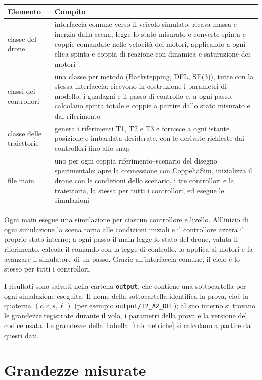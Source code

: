 \documentclass[11pt,a4paper]{article}
\begin{document}
\begin{center}
\begin{tabularx}{\textwidth}{@{}l L@{}}
\toprule
Elemento & Compito \\
\midrule
classe del drone & interfaccia comune verso il veicolo simulato: ricava massa e inerzia dalla scena, legge lo stato misurato e converte spinta e coppie comandate nelle velocità dei motori, applicando a ogni elica spinta e coppia di reazione con dinamica e saturazione dei motori \\ \addlinespace
classi dei controllori & una classe per metodo (Backstepping, DFL, SE(3)), tutte con la stessa interfaccia: ricevono in costruzione i parametri di modello, i guadagni e il passo di controllo e, a ogni passo, calcolano spinta totale e coppie a partire dallo stato misurato e dal riferimento \\ \addlinespace
classe delle traiettorie & genera i riferimenti T1, T2 e T3 e fornisce a ogni istante posizione e imbardata desiderate, con le derivate richieste dai controllori fino allo snap \\ \addlinespace
file main & uno per ogni coppia riferimento--scenario del disegno sperimentale: apre la connessione con CoppeliaSim, inizializza il drone con le condizioni dello scenario, i tre controllori e la traiettoria, la stessa per tutti i controllori, ed esegue le simulazioni \\
\bottomrule
\end{tabularx}
\end{center}

Ogni main esegue una simulazione per ciascun controllore e livello. All'inizio di ogni simulazione la scena torna alle condizioni iniziali e il controllore azzera il proprio stato interno; a ogni passo il main legge lo stato del drone, valuta il riferimento, calcola il comando con la legge di controllo, lo applica ai motori e fa avanzare il simulatore di un passo. Grazie all'interfaccia comune, il ciclo è lo stesso per tutti i controllori.

I risultati sono salvati nella cartella \texttt{output}, che contiene una sottocartella per ogni simulazione eseguita. Il nome della sottocartella identifica la prova, cioè la quaterna $(c, r, s, \ell)$ (per esempio \texttt{output/T2\_A2\_DFL}); al suo interno si trovano le grandezze registrate durante il volo, i parametri della prova e la versione del codice usata. Le grandezze della Tabella~\ref{tab:metriche} si calcolano a partire da questi dati.

\section{Grandezze misurate}
\end{document}
